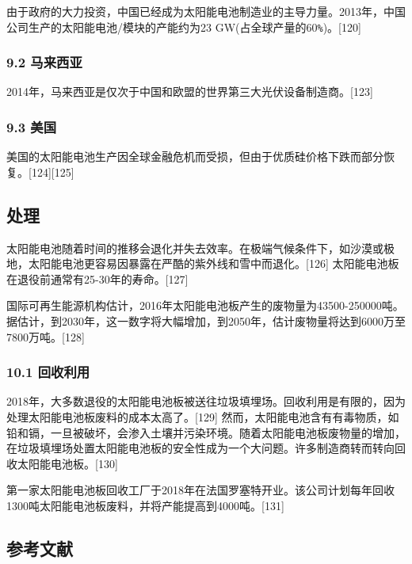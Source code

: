 由于政府的大力投资，中国已经成为太阳能电池制造业的主导力量。2013年，中国公司生产的太阳能电池/模块的产能约为23 GW(占全球产量的60\verb|%|)。[120]

\subsubsection{9.2 马来西亚}

2014年，马来西亚是仅次于中国和欧盟的世界第三大光伏设备制造商。[123]

\subsubsection{9.3 美国}

美国的太阳能电池生产因全球金融危机而受损，但由于优质硅价格下跌而部分恢复。[124][125]

\subsection{处理}

太阳能电池随着时间的推移会退化并失去效率。在极端气候条件下，如沙漠或极地，太阳能电池更容易因暴露在严酷的紫外线和雪中而退化。[126] 太阳能电池板在退役前通常有25-30年的寿命。[127]

国际可再生能源机构估计，2016年太阳能电池板产生的废物量为43500-250000吨。据估计，到2030年，这一数字将大幅增加，到2050年，估计废物量将达到6000万至7800万吨。[128]

\subsubsection{10.1 回收利用}

2018年，大多数退役的太阳能电池板被送往垃圾填埋场。回收利用是有限的，因为处理太阳能电池板废料的成本太高了。[129] 然而，太阳能电池含有有毒物质，如铅和镉，一旦被破坏，会渗入土壤并污染环境。随着太阳能电池板废物量的增加，在垃圾填埋场处置太阳能电池板的安全性成为一个大问题。许多制造商转而转向回收太阳能电池板。[130]

第一家太阳能电池板回收工厂于2018年在法国罗塞特开业。该公司计划每年回收1300吨太阳能电池板废料，并将产能提高到4000吨。[131]

\subsection{参考文献}

